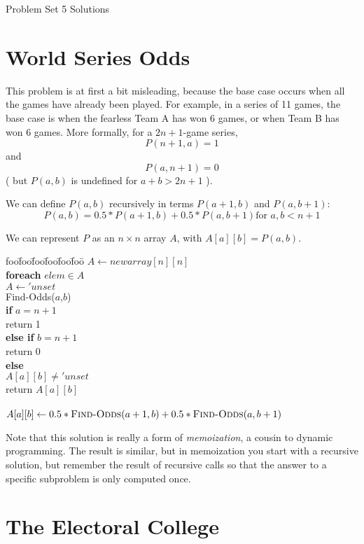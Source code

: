 \documentclass[12pt]{article}
\newenvironment{alg}{
\begin{tabbing}
foo\=foo\=foo\=foo\=foo\=foo\= \kill}
{\end{tabbing}}
\begin{document}
\begin{center}
{\large Problem Set 5 Solutions}
\end{center}

\section{World Series Odds}
% 


This problem is at first a bit misleading, because the base case occurs
when all the games have already been played.  For example, in a series of
11 games, the base case is when the fearless Team A has won 6 games, or
when Team B has won 6 games.  
More formally, for a $2n+1$-game series,
\[
 P(n+1,a)=1
\]
and
\[
 P(a,n+1)=0
\]
( but $P(a,b)$ is undefined for $a+b>2n+1$ ).

We can define $P(a,b)$ recursively in terms $P(a+1,b)$ and $P(a,b+1)$:
\[
  P(a,b) = 0.5*P(a+1,b) + 0.5*P(a,b+1) \mbox{for $a,b < n+1$}
\]

We can represent $P$ as an $n \times n$ array $A$, with $A[a][b] =
P(a,b)$.

\begin{alg}
$A \leftarrow new array[n][n]$ \\
{\bf foreach} ${\mathit elem} \in A$ \\
\> $A \leftarrow 'unset$ \\
{\sc Find-Odds}($a$,$b$) \\
\> {\bf if} $a = n+1$ \\
\> \>return 1 \\
\> {\bf else if} $b = n+1$ \\
\> \>return 0 \\
\> {\bf else} \\
\>  $A[a][b] \neq 'unset$ \\
\> \> \>return $A[a][b]$ \\
\>  \\
\> \> \>$A[a][b] \leftarrow 0.5*\mbox{\sc Find-Odds}(a+1,b) + 0.5*\mbox{\sc Find-Odds}(a,b+1)$
\end{alg}

Note that this solution is really a form of {\em memoization}, a cousin to
dynamic programming.  The result is similar, but in memoization you start
with a recursive solution, but remember the result of recursive calls so
that the answer to a specific subproblem is only computed once.

\section{The Electoral College}
\end{document}
